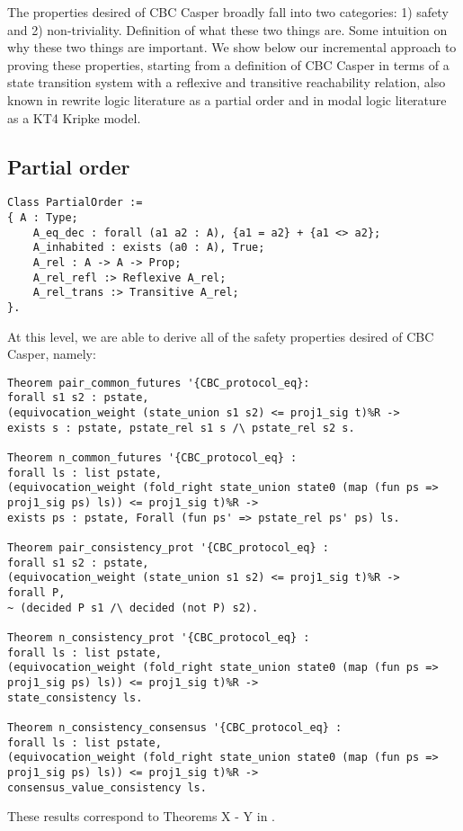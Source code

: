 The properties desired of CBC Casper broadly fall into two categories: 1) safety and 2) non-triviality. Definition of what these two things are. Some intuition on why these two things are important. We show below our incremental approach to proving these properties, starting from a definition of CBC Casper in terms of a state transition system with a reflexive and transitive reachability relation, also known in rewrite logic literature as a partial order and in modal logic literature as a KT4 Kripke model.
\subsection{Partial order} 
\begin{lstlisting}
Class PartialOrder :=
{ A : Type;
	A_eq_dec : forall (a1 a2 : A), {a1 = a2} + {a1 <> a2};
	A_inhabited : exists (a0 : A), True; 
	A_rel : A -> A -> Prop;
	A_rel_refl :> Reflexive A_rel;
	A_rel_trans :> Transitive A_rel;
}.
\end{lstlisting}
At this level, we are able to derive all of the safety properties desired of CBC Casper, namely: 
\begin{lstlisting}
Theorem pair_common_futures '{CBC_protocol_eq}:
forall s1 s2 : pstate,
(equivocation_weight (state_union s1 s2) <= proj1_sig t)%R ->
exists s : pstate, pstate_rel s1 s /\ pstate_rel s2 s.

Theorem n_common_futures '{CBC_protocol_eq} :
forall ls : list pstate,
(equivocation_weight (fold_right state_union state0 (map (fun ps => proj1_sig ps) ls)) <= proj1_sig t)%R ->
exists ps : pstate, Forall (fun ps' => pstate_rel ps' ps) ls.

Theorem pair_consistency_prot '{CBC_protocol_eq} :
forall s1 s2 : pstate,
(equivocation_weight (state_union s1 s2) <= proj1_sig t)%R ->
forall P, 
~ (decided P s1 /\ decided (not P) s2).

Theorem n_consistency_prot '{CBC_protocol_eq} :
forall ls : list pstate,
(equivocation_weight (fold_right state_union state0 (map (fun ps => proj1_sig ps) ls)) <= proj1_sig t)%R ->
state_consistency ls.

Theorem n_consistency_consensus '{CBC_protocol_eq} :
forall ls : list pstate,
(equivocation_weight (fold_right state_union state0 (map (fun ps => proj1_sig ps) ls)) <= proj1_sig t)%R ->
consensus_value_consistency ls. 
\end{lstlisting}
These results correspond to Theorems X - Y in \cite{CBCfull}. 
\newline


